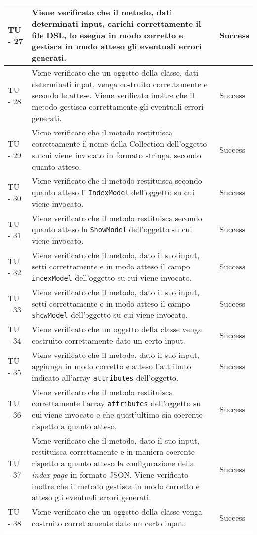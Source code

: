 \begin{center}
\begin{longtable}{ | p{3cm} | p{9cm} | p{2cm} | }
TU - 27 & Viene verificato che il metodo, dati determinati input, carichi correttamente il file DSL, lo esegua in modo corretto e gestisca in modo atteso gli eventuali errori generati. & Success \\ \hline
TU - 28 & Viene verificato che un oggetto della classe, dati determinati input, venga costruito correttamente e secondo le attese. Viene verificato inoltre che il metodo gestisca correttamente gli eventuali errori generati. & Success \\ \hline
TU - 29 & Viene verificato che il metodo restituisca correttamente il nome della Collection dell'oggetto su cui viene invocato in formato stringa, secondo quanto atteso. & Success \\ \hline
TU - 30 & Viene verificato che il metodo restituisca secondo quanto atteso l' \texttt{IndexModel} dell'oggetto su cui viene invocato. & Success \\ \hline
TU - 31 & Viene verificato che il metodo restituisca secondo quanto atteso lo \texttt{ShowModel} dell'oggetto su cui viene invocato. & Success \\ \hline
TU - 32 & Viene verificato che il metodo, dato il suo input, setti correttamente e in modo atteso il campo \texttt{indexModel} dell'oggetto su cui viene invocato. & Success \\ \hline
TU - 33 & Viene verificato che il metodo, dato il suo input, setti correttamente e in modo atteso il campo \texttt{showModel} dell'oggetto su cui viene invocato. & Success \\ \hline
TU - 34 & Viene verificato che un oggetto della classe venga costruito correttamente dato un certo input. & Success \\ \hline
TU - 35 & Viene verificato che il metodo, dato il suo input, aggiunga in modo corretto e atteso l'attributo indicato all'array \texttt{attributes} dell'oggetto. & Success \\ \hline
TU - 36 & Viene verificato che il metodo restituisca correttamente l'array \texttt{attributes} dell'oggetto su cui viene invocato e che quest'ultimo sia coerente rispetto a quanto atteso. & Success \\ \hline
TU - 37 & Viene verificato che il metodo, dato il suo input, restituisca correttamente e in maniera coerente rispetto a quanto atteso la configurazione della \textit{index-page} in formato JSON. Viene verificato inoltre che il metodo gestisca in modo corretto e atteso gli eventuali errori generati. & Success \\ \hline
TU - 38 & Viene verificato che un oggetto della classe venga costruito correttamente dato un certo input. & Success \\ \hline

\end{longtable}
\end{center}
